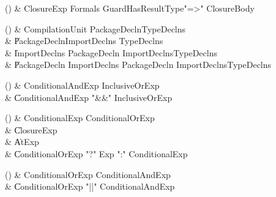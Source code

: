 \begin{bbgrammarappendix}{4.0in}

() & ClosureExp \label{prod:ClosureExp}  \: Formals Guard\opt HasResultType\opt \xcd"=>" ClosureBody  \\


\end{bbgrammarappendix}

\begin{bbgrammarappendix}{3.5in}

() & CompilationUnit \label{prod:CompilationUnit}  \: PackageDecln\opt TypeDeclns\opt  \\

 &    \| PackageDecln\opt ImportDeclns TypeDeclns\opt \\
 &    \| ImportDeclns PackageDecln  ImportDeclns\opt  TypeDeclns\opt \\
 &    \| PackageDecln ImportDeclns PackageDecln  ImportDeclns\opt  TypeDeclns\opt \\

\end{bbgrammarappendix}

\begin{bbgrammarappendix}{3.3in}

() & ConditionalAndExp \label{prod:ConditionalAndExp}  \: InclusiveOrExp  \\

 &    \| ConditionalAndExp \xcd"&&" InclusiveOrExp \\

\end{bbgrammarappendix}

\begin{bbgrammarappendix}{3.6in}

() & ConditionalExp \label{prod:ConditionalExp}  \: ConditionalOrExp  \\

 &    \| ClosureExp \\
 &    \| AtExp \\
 &    \| ConditionalOrExp \xcd"?" Exp \xcd":" ConditionalExp \\

\end{bbgrammarappendix}

\begin{bbgrammarappendix}{3.4in}

() & ConditionalOrExp \label{prod:ConditionalOrExp}  \: ConditionalAndExp  \\

 &    \| ConditionalOrExp \xcd"||" ConditionalAndExp \\

\end{bbgrammarappendix}

